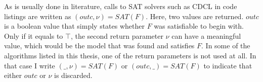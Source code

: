 As is usually done in literature, calls to SAT solvers such as CDCL in code listings are written as $(outc,\nu) = SAT(F)$. Here, two values are returned. $outc$ is a boolean value that simply states whether $F$ was satisfiable to begin with. Only if it equals to $\top$, the second return parameter $\nu$ can have a meaningful value, which would be the model that was found and satisfies $F$. In some of the algorithms listed in this thesis, one of the return parameters is not used at all. In that case I write $(\_,\nu) = SAT(F)$ or $(outc,\_) = SAT(F)$ to indicate that either $outc$ or $\nu$ is discarded.